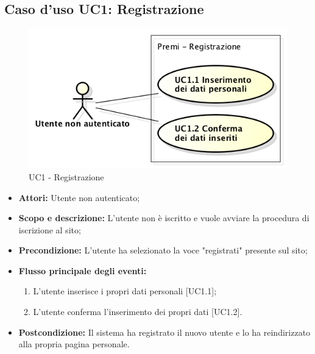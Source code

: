 \newpage
\subsection{Caso d'uso UC1: Registrazione}
\begin{figure}[h] 
	\centering 
	\includegraphics[scale=0.45] {img/UC1.png}
	\caption{UC1 - Registrazione} 
\end{figure}

\begin{itemize}
	\item \textbf{Attori:} Utente non autenticato;
	\item \textbf{Scopo e descrizione:} L'utente non è iscritto e vuole avviare la procedura di iscrizione al sito;
	\item \textbf{Precondizione:} L'utente ha selezionato la voce "registrati" presente sul sito;
	\item \textbf{Flusso principale degli eventi:}
	\begin{enumerate}
		\item L'utente inserisce i propri dati personali [UC1.1];
		\item L'utente conferma l'inserimento dei propri dati [UC1.2].
	\end{enumerate}
	\item \textbf{Postcondizione:} Il sistema ha registrato il nuovo utente e lo ha reindirizzato alla propria pagina personale.
\end{itemize}

